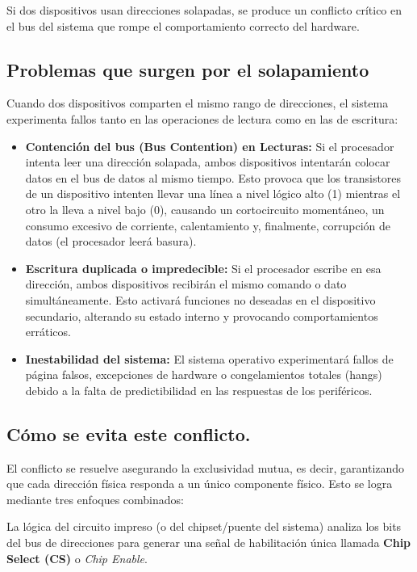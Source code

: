 \documentclass{article}
\begin{document}
Si dos dispositivos usan direcciones solapadas, se produce un conflicto crítico en el bus del sistema que rompe el comportamiento correcto del hardware.

\subsection{Problemas que surgen por el solapamiento}

Cuando dos dispositivos comparten el mismo rango de direcciones, el sistema experimenta fallos tanto en las operaciones de lectura como en las de escritura:


\begin{itemize}
  \item \textbf{Contención del bus (Bus Contention) en Lecturas:} Si el procesador intenta leer una dirección solapada, ambos dispositivos intentarán colocar datos en el bus de datos al mismo tiempo. Esto provoca que los transistores de un dispositivo intenten llevar una línea a nivel lógico alto (1) mientras el otro la lleva a nivel bajo (0), causando un cortocircuito momentáneo, un consumo excesivo de corriente, calentamiento y, finalmente, corrupción de datos (el procesador leerá basura).

  \item \textbf{Escritura duplicada o impredecible:} Si el procesador escribe en esa dirección, ambos dispositivos recibirán el mismo comando o dato simultáneamente. Esto activará funciones no deseadas en el dispositivo secundario, alterando su estado interno y provocando comportamientos erráticos.
  
  \item \textbf{Inestabilidad del sistema:} El sistema operativo experimentará fallos de página falsos, excepciones de hardware o congelamientos totales (hangs) debido a la falta de predictibilidad en las respuestas de los periféricos.
\end{itemize}


\subsection{Cómo se evita este conflicto.}


El conflicto se resuelve asegurando la exclusividad mutua, es decir, garantizando que cada dirección física responda a un único componente físico. Esto se logra mediante tres enfoques combinados:


La lógica del circuito impreso (o del chipset/puente del sistema) analiza los bits del bus de direcciones para generar una señal de habilitación única llamada \textbf{Chip Select (CS)} o \textit{Chip Enable}.
\end{document}
